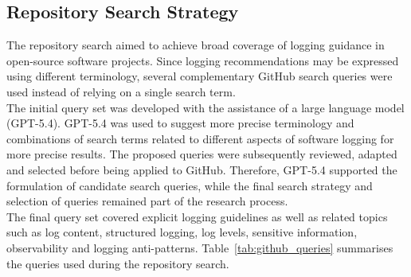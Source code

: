 \subsection{Repository Search Strategy}

The repository search aimed to achieve broad coverage of logging guidance in open-source
software projects. Since logging recommendations may be expressed using different
terminology, several complementary GitHub search queries were used instead of relying
on a single search term.
\\
The initial query set was developed with the assistance of a large language model (GPT-5.4).
GPT-5.4 was used to suggest more precise terminology and combinations of search terms related to
different aspects of software logging for more precise results. The proposed queries were subsequently reviewed,
adapted and selected before being applied to GitHub. Therefore, GPT-5.4 supported the
formulation of candidate search queries, while the final search strategy and selection
of queries remained part of the research process.
\\
The final query set covered explicit logging guidelines as well as related topics
such as log content, structured logging, log levels, sensitive information,
observability and logging anti-patterns. Table~\ref{tab:github_queries}
summarises the queries used during the repository search.

